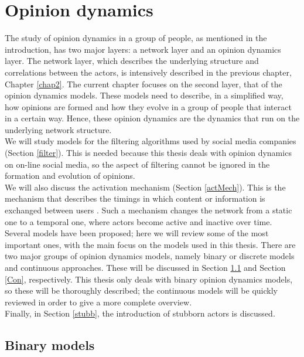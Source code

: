 \documentclass[11 pt , letterpaper , twoside , openright]{book}
\begin{document}
\chapter{Opinion dynamics}
\label{chap3}
The study of opinion dynamics in a group of people, as mentioned in the introduction, has two major layers: a network layer and an opinion dynamics layer. The network layer, which describes the underlying structure and correlations between the actors, is intensively described in the previous chapter, Chapter \ref{chap2}. The current chapter focuses on the second layer, that of the opinion dynamics models. These models need to describe, in a simplified way, how opinions are formed and how they evolve in a group of people that interact in a certain way. Hence, these opinion dynamics are the dynamics that run on the underlying network structure.\\
\newline
We will study models for the filtering algorithms used by social media companies (Section \ref{filter}). This is needed because this thesis deals with opinion dynamics on on-line social media, so the aspect of filtering cannot be ignored in the formation and evolution of opinions.\\
\newline
We will also discuss the activation mechanism (Section \ref{actMech}). This is the mechanism that describes the timings in which content or information is exchanged between users \cite{Perra2019}. Such a mechanism changes the network from a static one to a temporal one, where actors become active and inactive over time. \\
\newline
Several models have been proposed; here we will review some of the most important ones, with the main focus on the models used in this thesis. There are two major groups of opinion dynamics models, namely binary or discrete models and continuous approaches. These will be discussed in Section \ref{Bin} and Section \ref{Con}, respectively. This thesis only deals with binary opinion dynamics models, so these will be thoroughly described; the continuous models will be quickly reviewed in order to give a more complete overview.\\
\newline
Finally, in Section \ref{stubb}, the introduction of stubborn actors is discussed.

\section{Binary models}\label{Bin}
\end{document}
